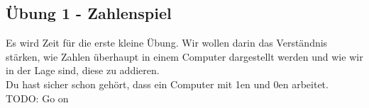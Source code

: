\subsection{Übung 1 - Zahlenspiel}
Es wird Zeit für die erste kleine Übung. Wir wollen darin das Verständnis stärken, wie Zahlen überhaupt in einem Computer
dargestellt werden und wie wir in der Lage sind, diese zu addieren.\\
Du hast sicher schon gehört, dass ein Computer mit 1en und 0en arbeitet.
TODO: Go on


